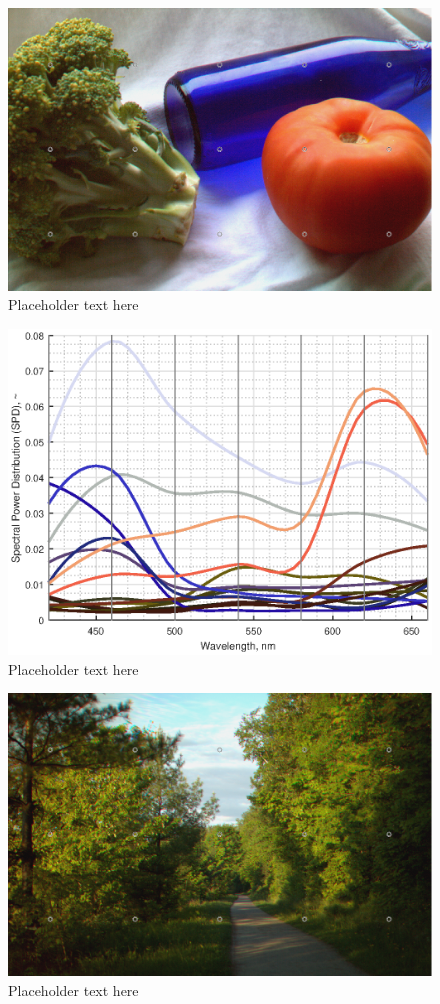 \documentclass[twocolumn,10pt]{asme2ej}
\begin{document}
\begin{figure}[H]
\begin{centering}
  \includegraphics[height=0.55\linewidth]{broccoli_bottle_tomato.png}
  \caption{Placeholder text here}
  \label{tomato_mesh}
  \end{centering}
\end{figure}

\begin{figure}[H]
\begin{centering}
  \includegraphics[height=0.6\linewidth]{broccoli_bottle_tomato.eps}
  \caption{Placeholder text here}
  \label{tomato_SPDs}
  \end{centering}
\end{figure}

\clearpage

\begin{figure}[H]
\begin{centering}
  \includegraphics[height=0.55\linewidth]{vermont_path.png}
  \caption{Placeholder text here}
  \label{path_mesh}
  \end{centering}
\end{figure}
\end{document}
